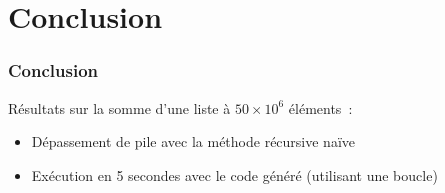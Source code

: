 
\section{Conclusion}

\begin{frame}
  \frametitle{Conclusion}

  Résultats sur la somme d’une liste à $50\times 10^6$ éléments~:
  \pause
  \begin{itemize}
    \item Dépassement de pile avec la méthode récursive naïve
    \item Exécution en 5 secondes avec le code généré (utilisant une boucle)
  \end{itemize}
\end{frame}

